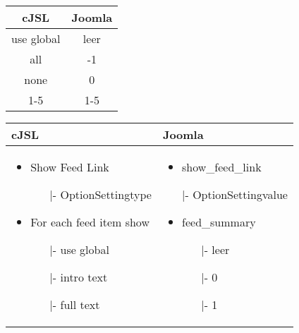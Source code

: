 \begin{minipage}{0.4\textwidth}
\begin{tabular}{|c|c|}
\hline
\textbf{cJSL} & \textbf{Joomla} \\ 
\hline
use global & leer \\ 
\hline
all & -1 \\ 
\hline
none & 0 \\ 
\hline
1-5 & 1-5 \\
\hline
\end{tabular}
\end{minipage}
\begin{minipage}{0.6\textwidth}
\begin{tabular}{|p{} | p{}|}
\hline
\textbf{cJSL} & \textbf{Joomla} \\ 
\hline
\begin{itemize}
	\item Show Feed Link
	\begin{enumerate}
		\item[|-]OptionSettingtype
	\end{enumerate}
	\item For each feed item show
	\begin{enumerate}
	 \item[|-] use global
	 \item[|-] intro text
	 \item[|-] full text
	\end{enumerate}
\end{itemize}
 & 
\begin{itemize}
	\item show\_feed\_link
	 \item[|-]OptionSettingvalue
	\item feed\_summary
	\begin{enumerate}
		 \item[|-]leer
		 \item[|-]0
		 \item[|-]1
		\end{enumerate}
	
\end{itemize}
\\
\hline
\end{tabular}
\end{minipage}

